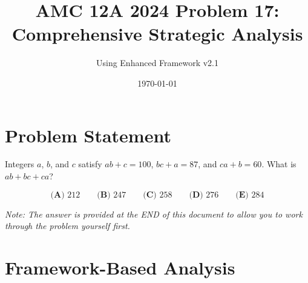 \documentclass[12pt]{article}
\title{\textbf{AMC 12A 2024 Problem 17:\\Comprehensive Strategic Analysis}}
\author{Using Enhanced Framework v2.1}
\date{\today}
\begin{document}
\maketitle

\section*{Problem Statement}

Integers $a$, $b$, and $c$ satisfy $ab + c = 100$, $bc + a = 87$, and $ca + b = 60$. What is $ab + bc + ca$?

$$\textbf{(A) } 212 \qquad \textbf{(B) } 247 \qquad \textbf{(C) } 258 \qquad \textbf{(D) } 276 \qquad \textbf{(E) } 284$$

\vspace{1em}
\noindent\textit{Note: The answer is provided at the END of this document to allow you to work through the problem yourself first.}

\section*{Framework-Based Analysis}
\end{document}
